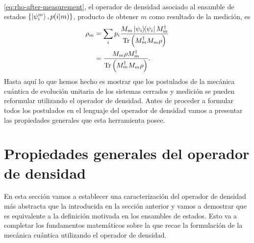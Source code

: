 \eqref{eq:rho-after-measurement}, el operador
de densidad asociado al ensamble de estados 
$\qty{\ket{\psi_i^m},p(i\vert m)}$, producto de obtener $m$ como resultado
de la medición, es
\begin{align}
	\rho _m &= \sum _i p_i \frac{M_m\dyad{\psii}{\psii}M_m^{\dagger}}
	{\Tr \qty(M_m^{\dagger}M_m\rho)} \nonumber \\
					&= \frac{M_m\rho M_m^{\dagger}}
	{\Tr \qty(M_m^{\dagger}M_m\rho)}.
\end{align}
Hasta aquí lo que hemos hecho es mostrar que los postulados de la
mecánica cuántica de evolución unitaria de los sistemas cerrados y 
medición se pueden reformular utilizando el operador de densidad.
Antes de proceder a formular todos los postulados en el lenguaje del 
operador de densidad vamos a presentar las propiedades generales
que esta herramienta posee. 


\section{Propiedades generales del operador de densidad} %

En esta sección vamos a establecer una caracterización del 
operador de densidad más abstracta que la introducida en 
la sección anterior y vamos a demostrar que es equivalente 
a la definición motivada en los ensambles de estados. 
Esto va a completar los fundamentos matemáticos
sobre la que recae la formulación de la mecánica cuántica 
utilizando el operador de densidad. 


